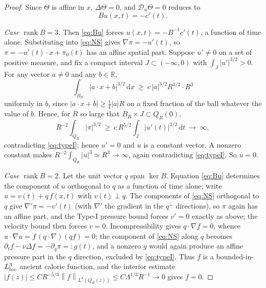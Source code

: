 \documentclass[11pt,reqno]{amsart}
\newcommand{\R}{\mathbb{R}}
\newcommand{\dd}{\,\mathrm{d}}
\newcommand{\norm}[1]{\left\lVert #1\right\rVert}
\newcommand{\abs}[1]{\left\lvert #1\right\rvert}
\DeclareMathOperator{\rank}{rank}
\theoremstyle{definition}
\begin{document}
\begin{proof}
Since $\Theta$ is affine in $x$, $\Delta\Theta=0$, and $\mathcal D_u\Theta=0$ reduces to
\begin{equation}\label{eq:Bu}
  Bu(x,t)=-c'(t) .
\end{equation}

\emph{Case $\rank B=3$.} Then \eqref{eq:Bu} forces $u(x,t)=-B^{-1}c'(t)$, a function of
time alone. Substituting into \eqref{eq:NS} gives $\nabla\pi=-u'(t)$, so
$\pi=-u'(t)\cdot x+\pi_0(t)$ has an affine spatial part. Suppose $u'\ne0$ on a set of
positive measure, and fix a compact interval $J\subset(-\infty,0)$ with
$\int_J\abs{u'}^{3/2}>0$. For any vector $a\ne0$ and any $b\in\R$,
\[
  \int_{B_R}\abs{a\cdot x+b}^{3/2}\dd x\ \ge\ c\,\abs a^{3/2}R^{3/2}\cdot R^3
\]
uniformly in $b$, since $\abs{a\cdot x+b}\ge\tfrac14\abs a R$ on a fixed fraction of the
ball whatever the value of $b$. Hence, for $R$ so large that $B_R\times J\subset Q_R(0)$,
\[
  R^{-2}\int_{Q_R}\abs\pi^{3/2}
  \ \ge\ c\,R^{5/2}\int_J\abs{u'(t)}^{3/2}\dd t\ \longrightarrow\ \infty ,
\]
contradicting \eqref{eq:typeI}; hence $u'=0$ and $u$ is a constant vector. A nonzero constant makes
$R^{-2}\int_{Q_R}\abs u^3\simeq R^3\to\infty$, again contradicting \eqref{eq:typeI}. So
$u=0$.

\emph{Case $\rank B=2$.} Let the unit vector $q$ span $\ker B$. Equation \eqref{eq:Bu}
determines the component of $u$ orthogonal to $q$ as a function of time alone; write
$u=v(t)+q\,f(x,t)$ with $v(t)\perp q$. The components of \eqref{eq:NS} orthogonal to $q$
give $\nabla'\pi=-v'(t)$ (with $\nabla'$ the gradient in the $q^\perp$ directions), so
$\pi$ again has an affine part, and the Type-I pressure bound forces $v'=0$ exactly as
above; the velocity bound then forces $v=0$. Incompressibility gives $q\cdot\nabla f=0$,
whence $u\cdot\nabla u=f\,(q\cdot\nabla)(qf)=0$; the component of \eqref{eq:NS} along $q$
becomes $\partial_tf-\nu\Delta f=-\partial_q\pi=:g(t)$, and a nonzero $g$ would again
produce an affine pressure part in the $q$ direction, excluded by \eqref{eq:typeI}. Thus
$f$ is a bounded-in-$L^3_{\rm loc}$ ancient caloric function, and the interior estimate
$\abs{f(z)}\le CR^{-5/3}\norm{f}_{L^3(Q_R(z))}\le C\Lambda^{1/3}R^{-1}\to0$ gives $f=0$.


\end{proof}
\end{document}
